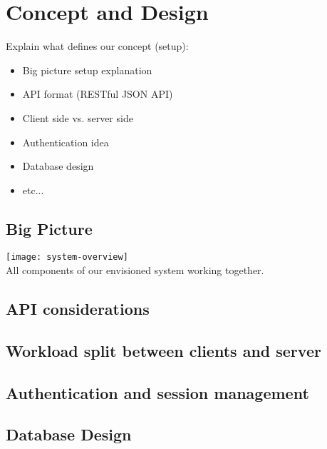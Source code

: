 \chapter{Concept and Design}
\label{cha:conceptanddesign}

Explain what defines our concept (setup):
\begin{itemize}
    \item Big picture setup explanation
    \item API format (RESTful JSON API)
    \item Client side vs. server side
    \item Authentication idea
    \item Database design
    \item etc...
\end{itemize}

\hline


\vspace{0.5cm}

\section{Big Picture}

\begin{center}
    \texttt{[image: system-overview]}\\
    All components of our envisioned system working together.
\end{center}


\vspace{0.5cm}

\section{API considerations}


\vspace{0.5cm}

\section{Workload split between clients and server}


\vspace{0.5cm}

\section{Authentication and session management}


\vspace{0.5cm}

\section{Database Design}